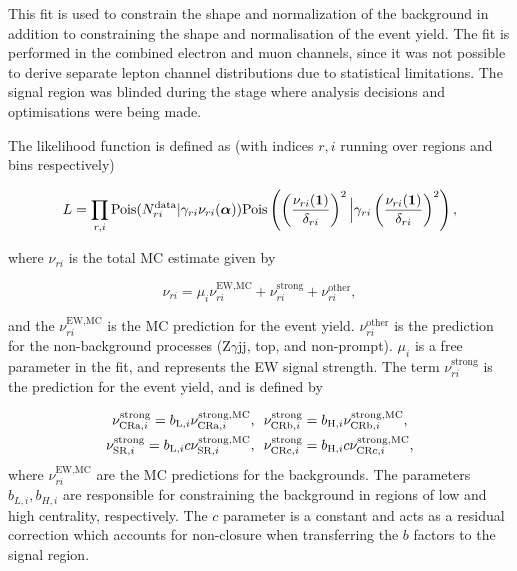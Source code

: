 This fit is used to constrain the shape and normalization of the \qcdwy background in addition to constraining the shape and normalisation of the \ewwy event yield. The fit is performed in the combined electron and muon channels, since it was not possible to derive separate lepton channel distributions due to statistical limitations. The signal region was blinded during the stage where analysis decisions and optimisations were being made.

The likelihood function is defined as (with indices $r,i$ running over regions and bins respectively)

\begin{equation}\label{eq:likelihood}
    L = \prod_{r,i} \text{Pois}(N^{\text{data}}_{ri} | \gamma_{ri}\nu_{ri}(\boldsymbol{\alpha})) \text{Pois}\left(\left(\frac{\nu_{ri}(\mathbf{1})}{\delta_{ri}}\right)^2 \Big{|} \gamma_{ri}\left(\frac{\nu_{ri}(\mathbf{1})}{\delta_{ri}}\right)^2\right),
\end{equation}

where $\nu_{ri}$ is the total MC estimate given by

\begin{equation}\label{eq:nu}
  \nu_{ri}=\mu_i\nu_{ri}^{\text{EW,MC}}+\nu_{ri}^{\text{strong}}+\nu_{ri}^{\text{other}},
\end{equation}

and the $\nu_{ri}^{\text{EW,MC}}$ is the MC prediction for the \ewwy event yield. $\nu_{ri}^{\text{other}}$ is the prediction for the non-\qcdwy background processes (Z$\gamma$jj, top, and non-prompt). $\mu_i$ is a free parameter in the fit, and represents the EW signal strength. The term $\nu_{ri}^{\text{strong}}$ is the prediction for the \qcdwy event yield, and is defined by

\begin{align}\label{eq:strongmcfit}
   \centering
   \nu_{\text{CRa},i}^{\text{strong}}=b_{\text{L},i}\nu_{\text{CRa},i}^{\text{strong,MC}}&,\hspace{5pt}
   \nu_{\text{CRb},i}^{\text{strong}}=b_{\text{H},i}\nu_{\text{CRb},i}^{\text{strong,MC}},\\
   \nu_{\text{SR},i}^{\text{strong}}=b_{\text{L},i}c\nu_{\text{SR},i}^{\text{strong,MC}}&,\hspace{5pt}
   \nu_{\text{CRc},i}^{\text{strong}}=b_{\text{H},i}c\nu_{\text{CRc},i}^{\text{strong,MC}},
   \label{eq:strongmcfit2}
\end{align}
where $\nu_{ri}^{\text{EW,MC}}$ are the MC predictions for the \qcdwy backgrounds. The parameters $b_{L,i}, b_{H,i}$ are responsible for constraining the \qcdwy background in regions of low and high centrality, respectively. The $c$ parameter is a constant and acts as a residual correction which accounts for non-closure when transferring the $b$ factors to the signal region.

